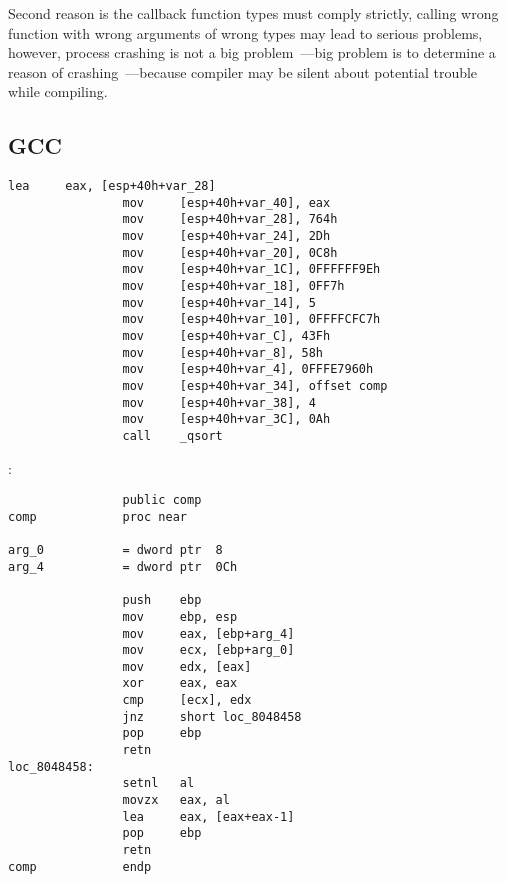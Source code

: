 {Second reason is the callback function types must comply strictly, calling wrong function
with wrong arguments of wrong types may lead to serious problems, however, process crashing is not a 
big problem~---big problem is to determine a reason of crashing~---because compiler may be 
silent about potential trouble while compiling.}

\subsection{GCC}


\begin{lstlisting}[caption=GCC]
                lea     eax, [esp+40h+var_28]
                mov     [esp+40h+var_40], eax
                mov     [esp+40h+var_28], 764h
                mov     [esp+40h+var_24], 2Dh
                mov     [esp+40h+var_20], 0C8h
                mov     [esp+40h+var_1C], 0FFFFFF9Eh
                mov     [esp+40h+var_18], 0FF7h
                mov     [esp+40h+var_14], 5
                mov     [esp+40h+var_10], 0FFFFCFC7h
                mov     [esp+40h+var_C], 43Fh
                mov     [esp+40h+var_8], 58h
                mov     [esp+40h+var_4], 0FFFE7960h
                mov     [esp+40h+var_34], offset comp
                mov     [esp+40h+var_38], 4
                mov     [esp+40h+var_3C], 0Ah
                call    _qsort
\end{lstlisting}

:

\begin{lstlisting}
                public comp
comp            proc near

arg_0           = dword ptr  8
arg_4           = dword ptr  0Ch

                push    ebp
                mov     ebp, esp
                mov     eax, [ebp+arg_4]
                mov     ecx, [ebp+arg_0]
                mov     edx, [eax]
                xor     eax, eax
                cmp     [ecx], edx
                jnz     short loc_8048458
                pop     ebp
                retn
loc_8048458:
                setnl   al
                movzx   eax, al
                lea     eax, [eax+eax-1]
                pop     ebp
                retn
comp            endp
\end{lstlisting}

